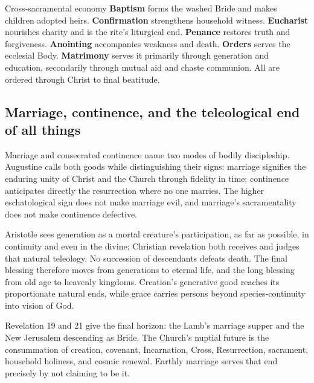 \begin{massbox}{Cross-sacramental economy}
\textbf{Baptism} forms the washed Bride and makes children adopted heirs. \textbf{Confirmation} strengthens household witness. \textbf{Eucharist} nourishes charity and is the rite's liturgical end. \textbf{Penance} restores truth and forgiveness. \textbf{Anointing} accompanies weakness and death. \textbf{Orders} serves the ecclesial Body. \textbf{Matrimony} serves it primarily through generation and education, secondarily through mutual aid and chaste communion. All are ordered through Christ to final beatitude.
\end{massbox}

\sectionguard
\subsection*{Marriage, continence, and the teleological end of all things}

Marriage and consecrated continence name two modes of bodily discipleship. Augustine calls both goods while distinguishing their signs: marriage signifies the enduring unity of Christ and the Church through fidelity in time; continence anticipates directly the resurrection where no one marries. The higher eschatological sign does not make marriage evil, and marriage's sacramentality does not make continence defective.

Aristotle sees generation as a mortal creature's participation, as far as possible, in continuity and even in the divine; Christian revelation both receives and judges that natural teleology. No succession of descendants defeats death. The final blessing therefore moves from generations to eternal life, and the long blessing from old age to heavenly kingdoms. Creation's generative good reaches its proportionate natural ends, while grace carries persons beyond species-continuity into vision of God.

Revelation 19 and 21 give the final horizon: the Lamb's marriage supper and the New Jerusalem descending as Bride. The Church's nuptial future is the consummation of creation, covenant, Incarnation, Cross, Resurrection, sacrament, household holiness, and cosmic renewal. Earthly marriage serves that end precisely by not claiming to be it.
